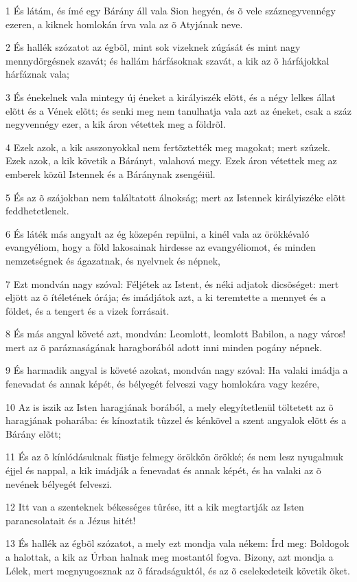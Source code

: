 \par 1 És látám, és ímé egy Bárány áll vala Sion hegyén, és õ vele száznegyvennégy  ezeren, a kiknek homlokán írva vala az õ Atyjának neve.
\par 2 És hallék szózatot az égbõl, mint sok vizeknek zúgását és mint nagy mennydörgésnek szavát; és hallám hárfásoknak szavát, a kik az õ hárfájokkal  hárfáznak vala;
\par 3 És énekelnek vala mintegy új éneket a királyiszék elõtt, és a négy  lelkes állat elõtt és a Vének elõtt; és senki meg nem tanulhatja vala azt az éneket, csak a száz negyvennégy ezer, a kik áron  vétettek meg a földrõl.
\par 4 Ezek azok, a kik asszonyokkal nem fertõztették meg magokat; mert szûzek. Ezek azok, a kik követik a Bárányt, valahová megy. Ezek áron vétettek meg az emberek közül Istennek és a Báránynak zsengéiül.
\par 5 És az õ szájokban nem találtatott álnokság; mert az Istennek királyiszéke elõtt feddhetetlenek.
\par 6 És láték más angyalt az ég közepén repülni, a kinél vala az örökkévaló evangyéliom, hogy a föld lakosainak hirdesse az evangyéliomot, és minden nemzetségnek és ágazatnak, és nyelvnek és népnek,
\par 7 Ezt mondván nagy szóval: Féljétek az Istent, és néki adjatok dicsõséget: mert eljött az õ ítéletének órája; és imádjátok azt, a ki teremtette  a mennyet és a földet, és a tengert és a vizek forrásait.
\par 8 És más angyal követé azt, mondván: Leomlott, leomlott Babilon,  a nagy város! mert az õ paráznaságának haragborából adott inni minden pogány népnek.
\par 9 És harmadik angyal is követé azokat, mondván nagy szóval: Ha valaki imádja a fenevadat és annak képét, és bélyegét felveszi vagy homlokára vagy kezére,
\par 10 Az is iszik az Isten haragjának borából, a mely elegyítetlenül töltetett az õ haragjának poharába: és kínoztatik tûzzel és kénkõvel a szent angyalok elõtt és a Bárány elõtt;
\par 11 És az õ kínlódásuknak füstje felmegy örökkön örökké; és nem lesz nyugalmuk éjjel és nappal, a kik imádják a fenevadat és annak képét, és ha valaki az õ nevének  bélyegét felveszi.
\par 12 Itt van a szenteknek békességes tûrése, itt a kik megtartják az Isten parancsolatait és a Jézus hitét!
\par 13 És hallék az égbõl szózatot, a mely ezt mondja vala nékem: Írd meg: Boldogok a halottak, a kik az Úrban halnak meg mostantól fogva. Bizony, azt mondja a Lélek, mert megnyugosznak az õ fáradságuktól, és az õ cselekedeteik  követik õket.
